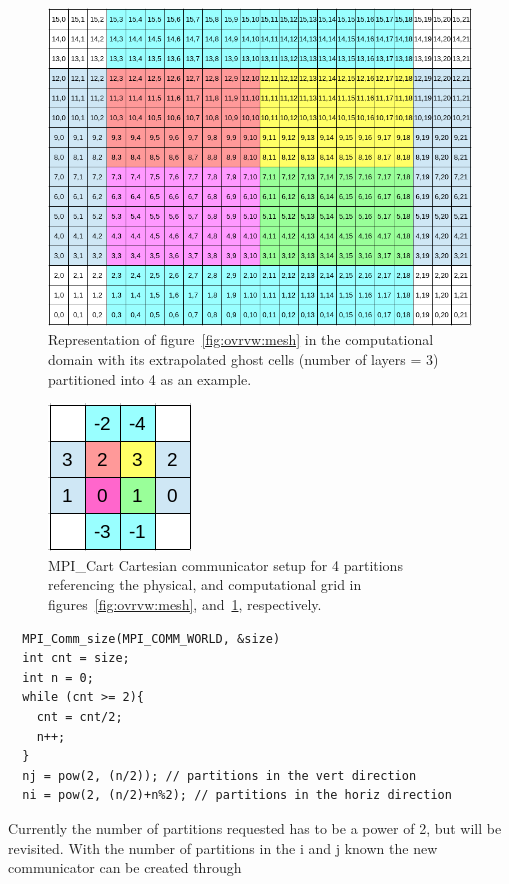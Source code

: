 \documentclass[paper=a4, fontsize=11pt]{scrartcl}
\numberwithin{equation}{section}                %
\numberwithin{figure}{section}                  %
\numberwithin{table}{section}                           %
\begin{document}
\begin{figure}[!htb]
  \centering
  \includegraphics[width=1.0\linewidth]{fig/16x10compDomain}
  \caption{Representation of figure~\ref{fig:ovrvw:mesh} in the computational domain with its extrapolated ghost cells (number of layers = 3) partitioned into 4 as an example.}\label{fig:code:compDom}
\end{figure}

\begin{figure}[!htb]
  \centering
  \includegraphics[width=0.175\linewidth]{fig/partition}
  \caption{MPI\_Cart Cartesian communicator setup for 4 partitions referencing the physical, and computational grid in figures~\ref{fig:ovrvw:mesh}, and~\ref{fig:code:compDom}, respectively.}\label{fig:code:part}
\end{figure}

\begin{verbatim}
  MPI_Comm_size(MPI_COMM_WORLD, &size)
  int cnt = size;
  int n = 0;
  while (cnt >= 2){
    cnt = cnt/2;
    n++;
  }
  nj = pow(2, (n/2)); // partitions in the vert direction
  ni = pow(2, (n/2)+n%2); // partitions in the horiz direction
\end{verbatim}

Currently the number of partitions requested has to be a power of 2, but will be revisited. With the number of partitions in the i and j known the new communicator can be created through
\end{document}
